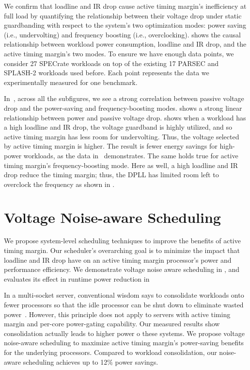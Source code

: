 We confirm that loadline and IR drop cause active timing margin's inefficiency at full load by quantifying the relationship between their voltage drop under static guardbanding with respect to the system's two optimization modes: power saving (i.e., undervolting) and frequency boosting (i.e., overclocking).  shows the causal relationship between workload power consumption, loadline and IR drop, and the active timing margin's two modes. To ensure we have enough data points, we consider 27 SPECrate workloads on top of the existing 17 PARSEC and SPLASH-2 workloads used before. Each point represents the data we experimentally measured for one benchmark.

In~, across all the subfigures, we see a strong correlation between passive voltage drop and the power-saving and frequency-boosting modes.  shows a strong linear relationship between power and passive voltage drop.  shows when a workload has a high loadline and IR drop, the voltage guardband is highly utilized, and so active timing margin has less room for undervolting. Thus, the voltage selected by active timing margin is higher. The result is fewer energy savings for high-power workloads, as the data in~ demonstrates. The same holds true for active timing margin's frequency-boosting mode. Here as well, a high loadline and IR drop reduce the timing margin; thus, the DPLL has limited room left to overclock the frequency as shown in .

\section{Voltage Noise-aware Scheduling}
\label{sec:voltage:opt}

We propose system-level scheduling techniques to improve the benefits of active timing margin. Our scheduler's overarching goal is to minimize the impact that loadline and IR drop have on an active timing margin processor's power and performance efficiency. We demonstrate voltage noise aware scheduling in , and evaluates its effect in runtime power reduction in 

In a multi-socket server, conventional wisdom says to consolidate workloads onto fewer processors so that the idle processor can be shut down to eliminate wasted power~\cite{murthy2013linux,lo2014towards,leverich2014reconciling}. However, this principle does not apply to servers with active timing margin and per-core power-gating capability. Our measured results show consolidation actually leads to higher power o these systems. We propose voltage noise-aware scheduling to maximize active timing margin's power-saving benefits for the underlying processors. Compared to workload consolidation, our noise-aware scheduling achieves up to 12\% power savings.

